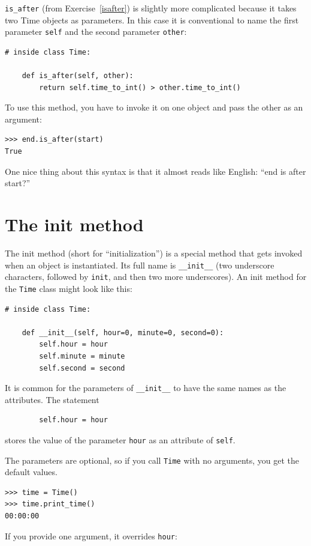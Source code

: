 \documentclass[10pt]{book}
\begin{document}
\verb"is_after" (from Exercise~\ref{isafter}) is slightly more complicated
because it takes two Time objects as parameters.  In this case it is
conventional to name the first parameter {\tt self} and the second
parameter {\tt other}:

\begin{verbatim}
# inside class Time:

    def is_after(self, other):
        return self.time_to_int() > other.time_to_int()
\end{verbatim}
%
To use this method, you have to invoke it on one object and pass
the other as an argument:

\begin{verbatim}
>>> end.is_after(start)
True
\end{verbatim}
%
One nice thing about this syntax is that it almost reads
like English: ``end is after start?''


\section{The init method}

The init method (short for ``initialization'') is
a special method that gets invoked when an object is instantiated.  
Its full name is \verb"__init__" (two underscore characters,
followed by {\tt init}, and then two more underscores).  An
init method for the {\tt Time} class might look like this:

\begin{verbatim}
# inside class Time:

    def __init__(self, hour=0, minute=0, second=0):
        self.hour = hour
        self.minute = minute
        self.second = second
\end{verbatim}
%
It is common for the parameters of \verb"__init__"
to have the same names as the attributes.  The statement

\begin{verbatim}
        self.hour = hour
\end{verbatim}
%
stores the value of the parameter {\tt hour} as an attribute
of {\tt self}.

The parameters are optional, so if you call {\tt Time} with
no arguments, you get the default values.

\begin{verbatim}
>>> time = Time()
>>> time.print_time()
00:00:00
\end{verbatim}
%
If you provide one argument, it overrides {\tt hour}:
\end{document}
